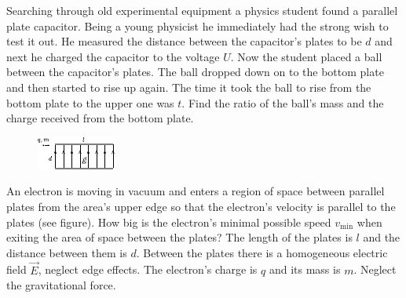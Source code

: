 \documentclass[11pt]{article}
\begin{document}

\probeng
Searching through old experimental equipment a physics student found a parallel plate capacitor. Being a young physicist he immediately had the strong wish to test it out. He measured the distance between the capacitor’s plates to be $d$ and next he charged the capacitor to the voltage $U$. Now the student placed a ball between the capacitor’s plates. The ball dropped down on to the bottom plate and then started to rise up again. The time it took the ball to rise from the bottom plate to the upper one was $t$. Find the ratio of the ball’s mass and the charge received from the bottom plate.
\probend
\bigskip


\probeng
\begin{figure}
	\vspace{-10pt}
	\hspace{-10pt}
	\includegraphics[width=\linewidth]{2017-lahg-03-elJoonisMK}
\end{figure}
An electron is moving in vacuum and enters a region of space between parallel plates from the area’s upper edge so that the electron’s velocity is parallel to the plates (see figure). How big is the electron’s minimal possible speed $v_\mathrm{min}$ when exiting the area of space between the plates? The length of the plates is $l$ and the distance between them is $d$. Between the plates there is a homogeneous electric field $\vec{E}$, neglect edge effects. The electron’s charge is $q$ and its mass is $m$. Neglect the gravitational force.
\probend
\bigskip

\end{document}
